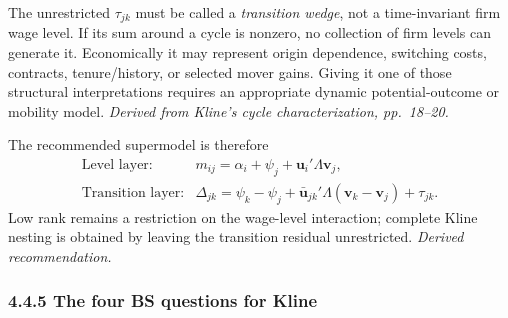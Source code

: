 \documentclass[11pt]{article}
\begin{document}
The unrestricted \(\tau_{jk}\) must be called a \emph{transition wedge}, not
a time-invariant firm wage level.  If its sum around a cycle is nonzero, no
collection of firm levels can generate it.  Economically it may represent
origin dependence, switching costs, contracts, tenure/history, or selected
mover gains.  Giving it one of those structural interpretations requires an
appropriate dynamic potential-outcome or mobility model.
\textit{Derived from Kline's cycle characterization, pp.\ 18--20.}

The recommended supermodel is therefore
\[
\boxed{
\begin{array}{ll}
\text{Level layer:}
&
m_{ij}=\alpha_i+\psi_j+\mathbf u_i'\Lambda\mathbf v_j,\\[0.3em]
\text{Transition layer:}
&
\Delta_{jk}
=
\psi_k-\psi_j
+\bar{\mathbf u}_{jk}'\Lambda(\mathbf v_k-\mathbf v_j)
+\tau_{jk}.
\end{array}}
\tag{T4.27}
\]
Low rank remains a restriction on the wage-level interaction; complete Kline
nesting is obtained by leaving the transition residual unrestricted.
\textit{Derived recommendation.}

\subsubsection{4.4.5 The four BS questions for Kline}
\end{document}
